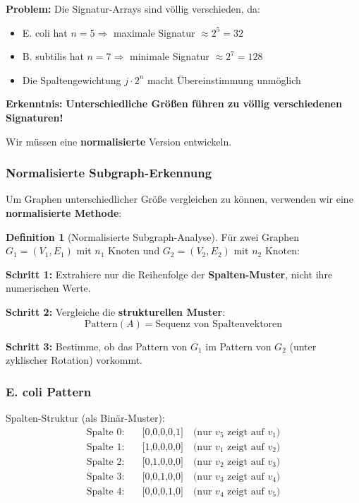 \documentclass[a4paper,12pt]{article}
\theoremstyle{definition}
\newtheorem{definition}{Definition}
\begin{document}
\textbf{Problem:} Die Signatur-Arrays sind völlig verschieden, da:
\begin{itemize}
    \item E. coli hat $n = 5 \Rightarrow$ maximale Signatur $\approx 2^5 = 32$
    \item B. subtilis hat $n = 7 \Rightarrow$ minimale Signatur $\approx 2^7 = 128$
    \item Die Spaltengewichtung $j \cdot 2^n$ macht Übereinstimmung unmöglich
\end{itemize}

\textbf{Erkenntnis:} \textbf{Unterschiedliche Größen führen zu völlig verschiedenen Signaturen!}

Wir müssen eine \textbf{normalisierte} Version entwickeln.


\subsubsection{Normalisierte Subgraph-Erkennung}

Um Graphen unterschiedlicher Größe vergleichen zu können, verwenden wir eine \textbf{normalisierte Methode}:

\begin{definition}[Normalisierte Subgraph-Analyse]
Für zwei Graphen $G_1 = (V_1, E_1)$ mit $n_1$ Knoten und $G_2 = (V_2, E_2)$ mit $n_2$ Knoten:

\textbf{Schritt 1:} Extrahiere nur die Reihenfolge der \textbf{Spalten-Muster}, nicht ihre numerischen Werte.

\textbf{Schritt 2:} Vergleiche die \textbf{strukturellen Muster}:
\[
\text{Pattern}(A) = \text{Sequenz von Spaltenvektoren}
\]

\textbf{Schritt 3:} Bestimme, ob das Pattern von $G_1$ im Pattern von $G_2$ (unter zyklischer Rotation) vorkommt.
\end{definition}

\subsubsection*{E. coli Pattern}

Spalten-Struktur (als Binär-Muster):
\begin{align*}
\text{Spalte 0:} &\quad \text{[0,0,0,0,1]} \quad \text{(nur } v_5 \text{ zeigt auf } v_1\text{)} \\
\text{Spalte 1:} &\quad \text{[1,0,0,0,0]} \quad \text{(nur } v_1 \text{ zeigt auf } v_2\text{)} \\
\text{Spalte 2:} &\quad \text{[0,1,0,0,0]} \quad \text{(nur } v_2 \text{ zeigt auf } v_3\text{)} \\
\text{Spalte 3:} &\quad \text{[0,0,1,0,0]} \quad \text{(nur } v_3 \text{ zeigt auf } v_4\text{)} \\
\text{Spalte 4:} &\quad \text{[0,0,0,1,0]} \quad \text{(nur } v_4 \text{ zeigt auf } v_5\text{)}
\end{align*}
\end{document}
